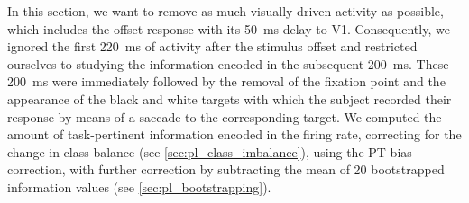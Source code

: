 In this section, we want to remove as much visually driven activity as possible, which includes the offset-response with its \SI{50}{\milli\second} delay to \ac{V1}.
Consequently, we ignored the first \SI{220}{\milli\second} of activity after the stimulus offset and restricted ourselves to studying the information encoded in the subsequent \SI{200}{\milli\second}.
These \SI{200}{\milli\second} were immediately followed by the removal of the fixation point and the appearance of the black and white targets with which the subject recorded their response by means of a saccade to the corresponding target.
We computed the amount of task-pertinent information encoded in the firing rate, correcting for the change in class balance (see \autoref{sec:pl_class_imbalance}), using the \ac{PT} bias correction, with further correction by subtracting the mean of \num{20} bootstrapped information values (see \autoref{sec:pl_bootstrapping}).

